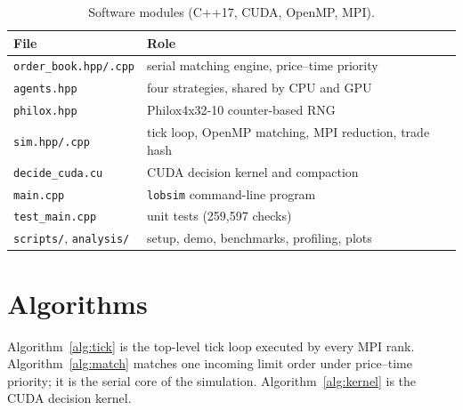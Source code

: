 \begin{table}[t]
\centering
\caption{Software modules (C++17, CUDA, OpenMP, MPI).}
\label{tab:modules}
\footnotesize
\begin{tabularx}{\columnwidth}{@{}l X@{}}
\toprule
File & Role\\
\midrule
\texttt{order\_book.hpp/.cpp} & serial matching engine, price--time priority\\
\texttt{agents.hpp} & four strategies, shared by CPU and GPU\\
\texttt{philox.hpp} & Philox4x32-10 counter-based RNG\\
\texttt{sim.hpp/.cpp} & tick loop, OpenMP matching, MPI reduction, trade hash\\
\texttt{decide\_cuda.cu} & CUDA decision kernel and compaction\\
\texttt{main.cpp} & \texttt{lobsim} command-line program\\
\texttt{test\_main.cpp} & unit tests (259{,}597 checks)\\
\texttt{scripts/}, \texttt{analysis/} & setup, demo, benchmarks, profiling, plots\\
\bottomrule
\end{tabularx}
\end{table}

\section{Algorithms}\label{sec:algo}
Algorithm~\ref{alg:tick} is the top-level tick loop executed by every MPI rank.
Algorithm~\ref{alg:match} matches one incoming limit order under price--time priority; it is the
serial core of the simulation. Algorithm~\ref{alg:kernel} is the CUDA decision kernel.

